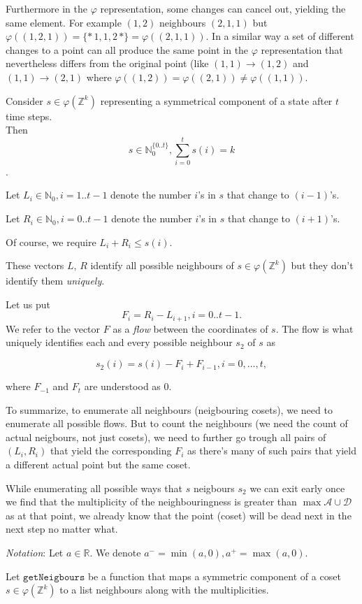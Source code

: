 \documentclass[]{article}
\newcommand{\NN}{\mathbb N}
\newcommand{\ZZ}{\mathbb Z}
\newcommand{\RR}{\mathbb R}
\newcommand{\calA}{\mathcal A}
\newcommand{\calD}{\mathcal D}
\begin{document}
	Furthermore in the $\varphi$ representation, some changes can cancel out, yielding the same element.
	For example $(1,2)$ neighbours $(2,1,1)$ but $\varphi((1,2,1)) = \{*\,1,1,2\,*\} = \varphi((2,1,1))$.
	In a similar way a set of different changes to a point can all produce the same point in the $\varphi$ representation that nevertheless differs from the original point (like $(1,1) \to (1,2)$ and $(1,1) \to (2,1)$ where
	$\varphi((1,2)) = \varphi((2,1)) \ne \varphi((1,1))$.
	
	Consider $s \in \varphi(\ZZ^k)$ representing a symmetrical component of a state after $t$ time steps.\\
	Then
	$$s \in \NN_0^{\{0..t\}}, \sum_{i=0}^t s(i) = k$$.
	
	Let $L_i \in \NN_0, i=1..t-1$ denote the number $i$'s in $s$ that change to $(i-1)$'s.	
	
	Let $R_i \in \NN_0, i=0..t-1$ denote the number $i$'s in $s$ that change to $(i+1)$'s.
	
	Of course, we require $L_i + R_i \leq s(i)$.
	
	These vectors $L$, $R$ identify all possible neighbours of $s \in \varphi(\ZZ^k)$ but they don't identify them \emph{uniquely}.
	
	Let us put
	$$F_i = R_i - L_{i+1}, i=0..t-1.$$
	We refer to the vector $F$ as a \emph{flow} between the coordinates of $s$.
	The flow is what uniquely identifies each and every possible neighbour $s_2$ of $s$ as
	
	$$s_2(i) = s(i) - F_i + F_{i-1}, i = 0, ..., t,$$
	
	where $F_{-1}$ and $F_t$ are understood as 0.
	
	To summarize, to enumerate all neighbours (neigbouring cosets), we need to enumerate all possible flows. But to count the neighbours (we need the count of actual neigbours, not just cosets), we need to further go trough all pairs of $(L_i, R_i)$ that yield the corresponding $F_i$ as there's many of such pairs that yield a different actual point but the same coset.
	
	While enumerating all possible ways that $s$ neigbours $s_2$ we can exit early once we find that the multiplicity of the neighbouringness is greater than $\max \calA \cup \calD$ as at that point, we already know that the point (coset) will be dead next in the next step no matter what.
	
	\emph{Notation}: Let $a \in \RR$. We denote $a^- = \min(a,0), a^+ = \max(a,0)$.
	
	Let $\texttt{getNeigbours}$ be a function that maps a symmetric component of a coset $s \in \varphi(\ZZ^k)$ to a list
	neighbours along with the multiplicities.
	
\end{document}
